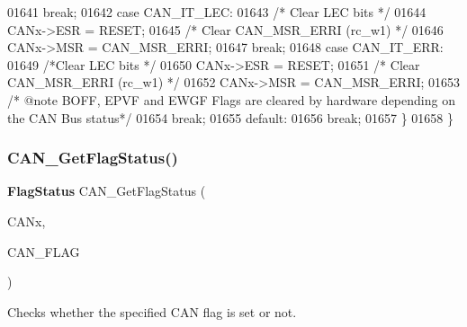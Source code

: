 \begin{DoxyCode}
01641        \textcolor{keywordflow}{break};
01642     \textcolor{keywordflow}{case} CAN_IT_LEC:
01643       \textcolor{comment}{/*  Clear LEC bits */}
01644       CANx->ESR = RESET; 
01645       \textcolor{comment}{/* Clear CAN\_MSR\_ERRI (rc\_w1) */}
01646       CANx->MSR = CAN_MSR_ERRI; 
01647       \textcolor{keywordflow}{break};
01648     \textcolor{keywordflow}{case} CAN_IT_ERR:
01649       \textcolor{comment}{/*Clear LEC bits */}
01650       CANx->ESR = RESET; 
01651       \textcolor{comment}{/* Clear CAN\_MSR\_ERRI (rc\_w1) */}
01652       CANx->MSR = CAN_MSR_ERRI; 
01653        \textcolor{comment}{/* @note BOFF, EPVF and EWGF Flags are cleared by hardware depending on the CAN Bus status*/}
01654        \textcolor{keywordflow}{break};
01655     \textcolor{keywordflow}{default}:
01656        \textcolor{keywordflow}{break};
01657    \}
01658 \}
\end{DoxyCode}
\mbox{\label{group__CAN__Group6_ga2faad96caf823ef463cc5b5b25c480bb}} 
\subsubsection{C\+A\+N\+\_\+\+Get\+Flag\+Status()}
{\footnotesize\ttfamily \textbf{ Flag\+Status} C\+A\+N\+\_\+\+Get\+Flag\+Status (\begin{DoxyParamCaption}\item[{\textbf{ C\+A\+N\+\_\+\+Type\+Def} $\ast$}]{C\+A\+Nx,  }\item[{uint32\+\_\+t}]{C\+A\+N\+\_\+\+F\+L\+AG }\end{DoxyParamCaption})}



Checks whether the specified C\+AN flag is set or not. 


